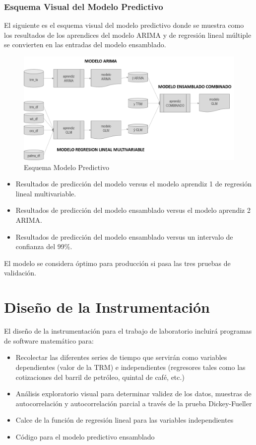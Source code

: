 \subsubsection{Esquema Visual del Modelo Predictivo}
El siguiente es el esquema visual del modelo predictivo donde se muestra como los resultados de los aprendices del modelo ARIMA y de regresión lineal múltiple se convierten en las entradas del modelo ensamblado.

\begin{figure}[H]
	\centering
	\includegraphics[width=5in]{images/EsquemaModeloPredictivo.png}	\caption{Esquema Modelo Predictivo}
\end{figure}

\begin{itemize}
	\item Resultados de predicción del modelo versus el modelo aprendiz 1 de regresión lineal multivariable.
	\item Resultados de predicción del modelo ensamblado versus el modelo aprendiz 2 ARIMA.
	\item Resultados de predicción del modelo ensamblado versus un intervalo de confianza del 99\%.
\end{itemize}

El modelo se considera óptimo para producción si pasa las tres pruebas de validación.

\section{Diseño de la Instrumentación}
El diseño de la instrumentación para el trabajo de laboratorio incluirá programas de software matemático para:

\begin{itemize}
    \item Recolectar las diferentes series de tiempo que servirán como variables dependientes (valor de la TRM) e independientes (regresores tales como las cotizaciones del barril de petróleo, quintal de café, etc.)
    \item Análisis exploratorio visual para determinar validez de los datos, muestras de autocorrelación y autocorrelación parcial a través de la prueba Dickey-Fueller
    \item Calce de la función de regresión lineal para las variables independientes
    \item Código para el modelo predictivo ensamblado
\end{itemize}

